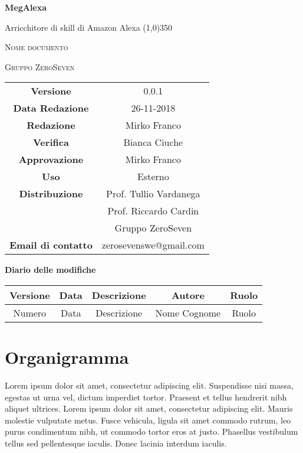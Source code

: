 \documentclass[a4paper,12pt]{book}
\author{Mirko Franco}
\date{26-11-2018}
\begin{document}
\begin{titlepage}
	\centering
	{\huge\bfseries MegAlexa\par}
	Arricchitore di skill di Amazon Alexa
	\line(1,0){350} \\
	{\scshape\LARGE Nome documento \par}
	\vspace{1cm}
	{\scshape Gruppo ZeroSeven \par}
	\logo
	\begin{tabular}{c|c}
		{\hfill \textbf{Versione}} 			& 0.0.1				\\
		{\hfill\textbf{Data Redazione}} 	& 26-11-2018		\\ 
		{\hfill\textbf{Redazione}} 			&  		Mirko Franco			\\ 
		{\hfill\textbf{Verifica}} 				&  	Bianca Ciuche				\\ 
		{\hfill\textbf{Approvazione}} 		&  		Mirko Franco			\\ 
		{\hfill\textbf{Uso}} 					& 		Esterno		\\ 
		{\hfill\textbf{Distribuzione}} 			& 			Prof. Tullio Vardanega \\ & Prof. Riccardo Cardin \\ & Gruppo ZeroSeven		\\ 
		{\hfill\textbf{Email di contatto}} & zerosevenswe@gmail.com \\
	\end{tabular}
\end{titlepage}
	

	
	\label{LastFrontPage}
	

	\newpage
	\cleardoublepage
	\begin{center}
		\textbf{Diario delle modifiche}
	\end{center}
	\begin{center}
		\begin{tabular}{|c|c|c|c|c|}
			\hline
			\textbf{Versione} & \textbf{Data} & \textbf{Descrizione} & \textbf{Autore} & \textbf{Ruolo} \\
			\hline
			Numero & Data & Descrizione & Nome Cognome & Ruolo\\
			\hline
		\end{tabular}
	\end{center}
	
	\cleardoublepage
	\pagestyle{mymain}
	
	\tableofcontents
	\cleardoublepage
	
	\chapter{Organigramma}
		Lorem ipsum dolor sit amet, consectetur adipiscing elit. Suspendisse nisi massa, egestas ut urna vel, dictum imperdiet tortor. Praesent et tellus hendrerit nibh aliquet ultrices. Lorem ipsum dolor sit amet, consectetur adipiscing elit. Mauris molestie vulputate metus. Fusce vehicula, ligula sit amet commodo rutrum, leo purus condimentum nibh, ut commodo tortor eros at justo. Phasellus vestibulum tellus sed pellentesque iaculis. Donec lacinia interdum iaculis.
		
\end{document}
